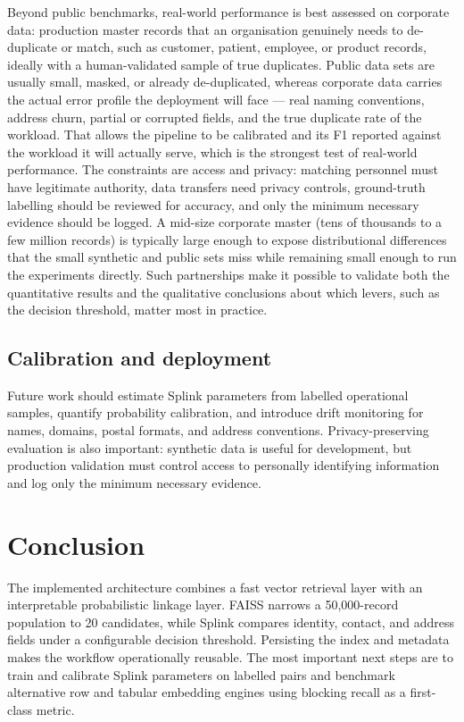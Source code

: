 \documentclass[conference]{IEEEtran}
\begin{document}
Beyond public benchmarks, real-world performance is best assessed on corporate data: production master records that an organisation genuinely needs to de-duplicate or match, such as customer, patient, employee, or product records, ideally with a human-validated sample of true duplicates. Public data sets are usually small, masked, or already de-duplicated, whereas corporate data carries the actual error profile the deployment will face --- real naming conventions, address churn, partial or corrupted fields, and the true duplicate rate of the workload. That allows the pipeline to be calibrated and its F1 reported against the workload it will actually serve, which is the strongest test of real-world performance. The constraints are access and privacy: matching personnel must have legitimate authority, data transfers need privacy controls, ground-truth labelling should be reviewed for accuracy, and only the minimum necessary evidence should be logged. A mid-size corporate master (tens of thousands to a few million records) is typically large enough to expose distributional differences that the small synthetic and public sets miss while remaining small enough to run the experiments directly. Such partnerships make it possible to validate both the quantitative results and the qualitative conclusions about which levers, such as the decision threshold, matter most in practice.

\subsection{Calibration and deployment}
Future work should estimate Splink parameters from labelled operational samples, quantify probability calibration, and introduce drift monitoring for names, domains, postal formats, and address conventions. Privacy-preserving evaluation is also important: synthetic data is useful for development, but production validation must control access to personally identifying information and log only the minimum necessary evidence.

\section{Conclusion}
The implemented architecture combines a fast vector retrieval layer with an interpretable probabilistic linkage layer. FAISS narrows a 50,000-record population to 20 candidates, while Splink compares identity, contact, and address fields under a configurable decision threshold. Persisting the index and metadata makes the workflow operationally reusable. The most important next steps are to train and calibrate Splink parameters on labelled pairs and benchmark alternative row and tabular embedding engines using blocking recall as a first-class metric.
\end{document}

